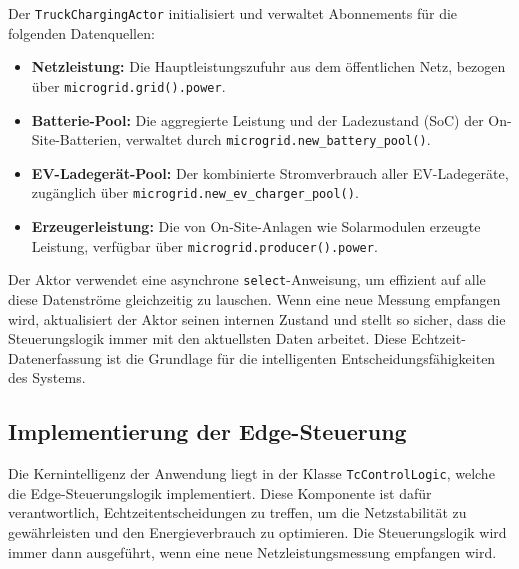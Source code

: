 \documentclass{article}
\begin{document}
Der \texttt{TruckChargingActor} initialisiert und verwaltet Abonnements für die folgenden Datenquellen:
\begin{itemize}
    \item \textbf{Netzleistung:} Die Hauptleistungszufuhr aus dem öffentlichen Netz, bezogen über \texttt{microgrid.grid().power}.
    \item \textbf{Batterie-Pool:} Die aggregierte Leistung und der Ladezustand (SoC) der On-Site-Batterien, verwaltet durch \texttt{microgrid.new\_battery\_pool()}.
    \item \textbf{EV-Ladegerät-Pool:} Der kombinierte Stromverbrauch aller EV-Ladegeräte, zugänglich über \texttt{microgrid.new\_ev\_charger\_pool()}.
    \item \textbf{Erzeugerleistung:} Die von On-Site-Anlagen wie Solarmodulen erzeugte Leistung, verfügbar über \texttt{microgrid.producer().power}.
\end{itemize}

Der Aktor verwendet eine asynchrone \texttt{select}-Anweisung, um effizient auf alle diese Datenströme gleichzeitig zu lauschen. Wenn eine neue Messung empfangen wird, aktualisiert der Aktor seinen internen Zustand und stellt so sicher, dass die Steuerungslogik immer mit den aktuellsten Daten arbeitet. Diese Echtzeit-Datenerfassung ist die Grundlage für die intelligenten Entscheidungsfähigkeiten des Systems.

\subsection{Implementierung der Edge-Steuerung}
Die Kernintelligenz der Anwendung liegt in der Klasse \texttt{TcControlLogic}, welche die Edge-Steuerungslogik implementiert. Diese Komponente ist dafür verantwortlich, Echtzeitentscheidungen zu treffen, um die Netzstabilität zu gewährleisten und den Energieverbrauch zu optimieren. Die Steuerungslogik wird immer dann ausgeführt, wenn eine neue Netzleistungsmessung empfangen wird.
\end{document}
